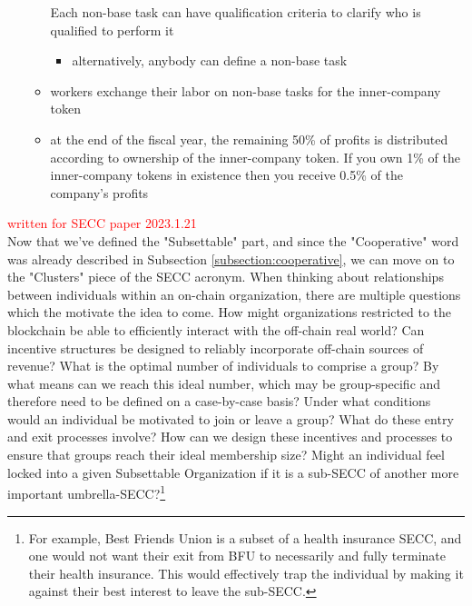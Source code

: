 \documentclass{article}[10pt]
\begin{document}
\begin{itemize}
\begin{itemize}
        Each non-base task can have qualification criteria to clarify who is qualified to perform it
        \begin{itemize}
            \item alternatively, anybody can define a non-base task
        \end{itemize}
        \item workers exchange their labor on non-base tasks for the inner-company token
        \item at the end of the fiscal year, the remaining 50\% of profits is distributed according to ownership of the inner-company token.
        If you own 1\% of the inner-company tokens in existence then you receive 0.5\% of the company's profits
    \end{itemize}
\end{itemize}



\vspace{0.1in}
\hline
\vspace{0.1in}
\textcolor{red}{written for SECC paper 2023.1.21}\\



Now that we've defined the "Subsettable" part, and since the "Cooperative" word was already described in Subsection \ref{subsection:cooperative}, we can move on to the "Clusters" piece of the SECC acronym. 
When thinking about relationships between individuals within an on-chain organization, there are multiple questions which the motivate the idea to come.
How might organizations restricted to the blockchain be able to efficiently interact with the off-chain real world?
Can incentive structures be designed to reliably incorporate off-chain sources of revenue?
What is the optimal number of individuals to comprise a group?
By what means can we reach this ideal number, which may be group-specific and therefore need to be defined on a case-by-case basis?
Under what conditions would an individual be motivated to join or leave a group?
What do these entry and exit processes involve?
How can we design these incentives and processes to ensure that groups reach their ideal membership size?
Might an individual feel locked into a given Subsettable Organization if it is a sub-SECC of another more important umbrella-SECC?\footnote{
    For example, Best Friends Union is a subset of a health insurance SECC, and one would not want their exit from BFU to necessarily and fully terminate their health insurance. 
    This would effectively trap the individual by making it against their best interest to leave the sub-SECC.} \par 
\end{document}
